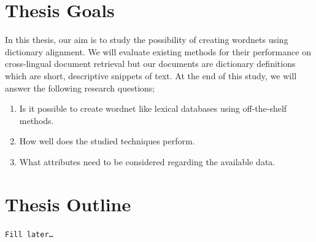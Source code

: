 \section{Thesis Goals}%
\label{sec:thesis_goals}
In this thesis, our aim is to study the possibility of creating wordnets using dictionary alignment.
We will evaluate existing methods for their performance on cross-lingual document retrieval but our documents are dictionary definitions which are short, descriptive snippets of text.
At the end of this study, we will answer the following research questions;

\begin{enumerate}
    \item Is it possible to create wordnet like lexical databases using off-the-shelf methods.
    \item How well does the studied techniques perform.
    \item What attributes need to be considered regarding the available data.
\end{enumerate}

\section{Thesis Outline}%
\label{sec:thesis_outline}
\texttt{Fill later\ldots}
